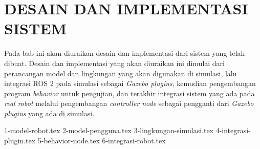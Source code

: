 \chapter{DESAIN DAN IMPLEMENTASI SISTEM}
\label{chap:desainimplementasi}

Pada bab ini akan diuraikan desain dan implementasi dari sistem yang telah dibuat.
Desain dan implementasi yang akan diuraikan ini dimulai dari perancangan model dan lingkungan yang akan digunakan di simulasi,
  lalu integrasi ROS 2 pada simulasi sebagai \emph{Gazebo plugins},
  kemudian pengembangan program \emph{behavior} untuk pengujian,
  dan terakhir integrasi sistem yang ada pada \emph{real robot} melalui pengembangan \emph{controller node} sebagai pengganti dari \emph{Gazebo plugins} yang ada di simulasi.

{1-model-robot.tex}
{2-model-pengguna.tex}
{3-lingkungan-simulasi.tex}
{4-integrasi-plugin.tex}
{5-behavior-node.tex}
{6-integrasi-robot.tex}
